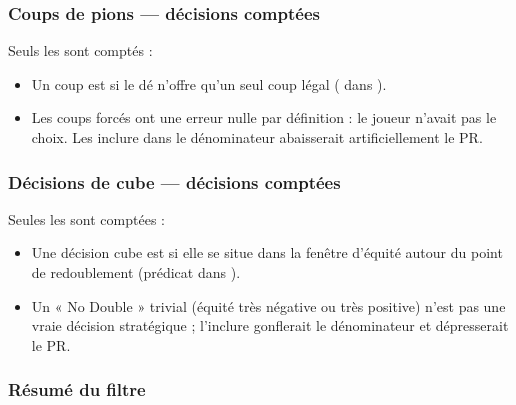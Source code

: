 \documentclass[letterpaper,10pt,french]{sphinxmanual}
\begin{document}
\subsubsection{Coups de pions — décisions comptées}
\label{\detokenize{stats_parity:coups-de-pions-decisions-comptees}}
\sphinxAtStartPar
Seuls les  sont comptés :
\begin{itemize}
\item {} 
\sphinxAtStartPar
Un coup est  si le dé n’offre qu’un seul coup légal (
dans ).

\item {} 
\sphinxAtStartPar
Les coups forcés ont une erreur nulle par définition : le joueur n’avait pas
le choix. Les inclure dans le dénominateur abaisserait artificiellement le PR.

\end{itemize}


\subsubsection{Décisions de cube — décisions comptées}
\label{\detokenize{stats_parity:decisions-de-cube-decisions-comptees}}
\sphinxAtStartPar
Seules les  sont comptées :
\begin{itemize}
\item {} 
\sphinxAtStartPar
Une décision cube est  si elle se situe dans la fenêtre d’équité
\sphinxcode{\sphinxupquote{{[}\sphinxhyphen{}0.16, +0.16{]}}} autour du point de redoublement (prédicat
 dans ).

\item {} 
\sphinxAtStartPar
Un « No Double » trivial (équité très négative ou très positive) n’est pas
une vraie décision stratégique ; l’inclure gonflerait le dénominateur et
dépresserait le PR.

\end{itemize}


\subsubsection{Résumé du filtre}
\label{\detokenize{stats_parity:resume-du-filtre}}
\end{document}
